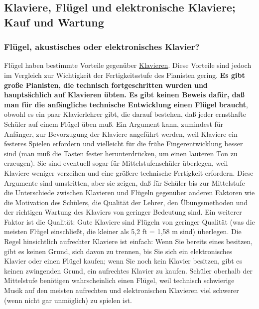 
\subsection{Klaviere, Flügel und elektronische Klaviere; Kauf und Wartung}
\label{c1iii17}
 
\subsubsection{Flügel, akustisches oder elektronisches Klavier?}
\label{c1iii17a}

Flügel haben bestimmte Vorteile gegenüber \hyperref[upright]{Klavieren}.
Diese Vorteile sind jedoch im Vergleich zur Wichtigkeit der Fertigkeitsstufe des Pianisten gering.
\textbf{Es gibt große Pianisten, die technisch fortgeschritten wurden und hauptsächlich auf Klavieren übten.
Es gibt keinen Beweis dafür, daß man für die anfängliche technische Entwicklung einen Flügel braucht}, obwohl es ein paar Klavierlehrer gibt, die darauf bestehen, daß jeder ernsthafte Schüler auf einem Flügel üben muß.
Ein Argument kann, zumindest für Anfänger, zur Bevorzugung der Klaviere angeführt werden, weil Klaviere ein festeres Spielen erfordern und vielleicht für die frühe Fingerentwicklung besser sind (man muß die Tasten fester herunterdrücken, um einen lauteren Ton zu erzeugen).
Sie sind eventuell sogar für Mittelstufenschüler überlegen, weil Klaviere weniger verzeihen und eine größere technische Fertigkeit erfordern.
Diese Argumente sind umstritten, aber sie zeigen, daß für Schüler bis zur Mittelstufe die Unterschiede zwischen Klavieren und Flügeln gegenüber anderen Faktoren wie die Motivation des Schülers, die Qualität der Lehrer, den Übungsmethoden und der richtigen Wartung des Klaviers von geringer Bedeutung sind.
Ein weiterer Faktor ist die Qualität: Gute Klaviere sind Flügeln von geringer Qualität (was die meisten Flügel einschließt, die kleiner als 5,2 ft = 1,58 m sind) überlegen.
Die Regel hinsichtlich aufrechter Klaviere ist einfach: Wenn Sie bereits eines besitzen, gibt es keinen Grund, sich davon zu trennen, bis Sie sich ein elektronisches Klavier oder einen Flügel kaufen; wenn Sie noch kein Klavier besitzen, gibt es keinen zwingenden Grund, ein aufrechtes Klavier zu kaufen.
Schüler oberhalb der Mittelstufe benötigen wahrscheinlich einen Flügel, weil technisch schwierige Musik auf den meisten aufrechten und elektronischen Klavieren viel schwerer (wenn nicht gar unmöglich) zu spielen ist.

